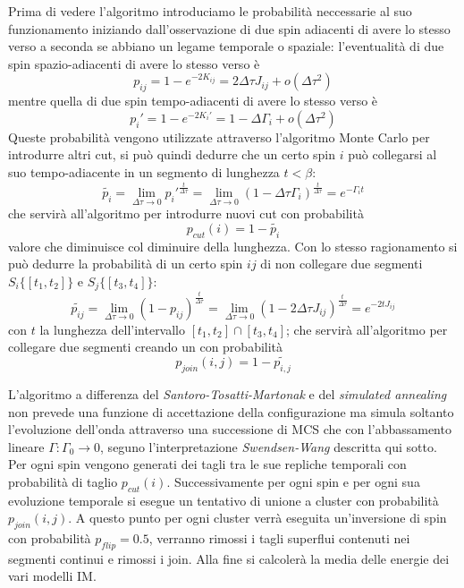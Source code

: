 Prima di vedere l'algoritmo introduciamo le probabilità neccessarie al suo funzionamento iniziando dall'osservazione di due spin adiacenti di avere lo stesso verso a seconda se abbiano un legame temporale o spaziale:
l'eventualità di due spin spazio-adiacenti di avere lo stesso verso è
$$p_{ij} = 1 - e^{-2K_{ij}} = 2\Delta \tau J_{ij} + o(\Delta \tau^2)$$
mentre quella di due spin tempo-adiacenti di avere lo stesso verso è
$$p_i' = 1 - e^{-2K_{i}'} = 1 - \Delta \Gamma_{i} + o(\Delta \tau^2)$$
Queste probabilità vengono utilizzate attraverso l'algoritmo Monte Carlo per introdurre altri cut, si può quindi dedurre che un certo spin $i$ può collegarsi al suo tempo-adiacente in un segmento di lunghezza $t < \beta$:
$$\tilde{p_i} = \lim_{\Delta \tau \to 0} p_i'^{\frac{t}{\Delta \tau}} = \lim_{\Delta \tau \to 0} (1 - \Delta \tau \Gamma_i)^\frac{t}{\Delta \tau} = e^{- \Gamma_i t}$$
che servirà all'algoritmo per introdurre nuovi cut con probabilità
$$p_{cut}(i) = 1 - \tilde{p_i}$$
valore che diminuisce col diminuire della lunghezza.
Con lo stesso ragionamento si può dedurre la probabilità di un certo spin $ij$ di non collegare due segmenti $S_i\{[t_1, t_2]\}$ e $S_j\{[t_3, t_4]\}$:
$$\tilde{p_{ij}} = \lim_{\Delta \tau \to 0} (1 - p_{ij})^\frac{t}{\Delta \tau} = \lim_{\Delta \tau \to 0} (1 - 2\Delta \tau J_{ij})^\frac{t}{\Delta \tau} = e^{-2 t J_{ij}}$$
con $t$ la lunghezza dell'intervallo $[t_1, t_2] \cap [t_3, t_4]$; che servirà all'algoritmo per collegare due segmenti creando un  con probabilità
$$p_{join}(i,j) = 1 - \tilde{p_{i,j}}$$

L'algoritmo a differenza del \textit{Santoro-Tosatti-Martonak} e del \textit{simulated annealing} non prevede una funzione di accettazione della configurazione ma simula soltanto l'evoluzione dell'onda attraverso una successione di MCS che con l'abbassamento lineare $\Gamma: \Gamma_0 \to 0$, seguno l'interpretazione \textit{Swendsen-Wang} descritta qui sotto.\\
Per ogni spin vengono generati dei tagli tra le sue repliche temporali con probabilità  di taglio $p_{cut}(i)$.
Successivamente per ogni spin e per ogni sua evoluzione temporale si esegue un tentativo di unione a cluster con probabilità $p_{join}(i,j)$.
A questo punto per ogni cluster verrà eseguita un'inversione di spin con probabilità $p_{flip} = 0.5$, verranno rimossi i tagli superflui contenuti nei segmenti continui e rimossi i join. Alla fine si calcolerà la media delle energie dei vari modelli IM.

